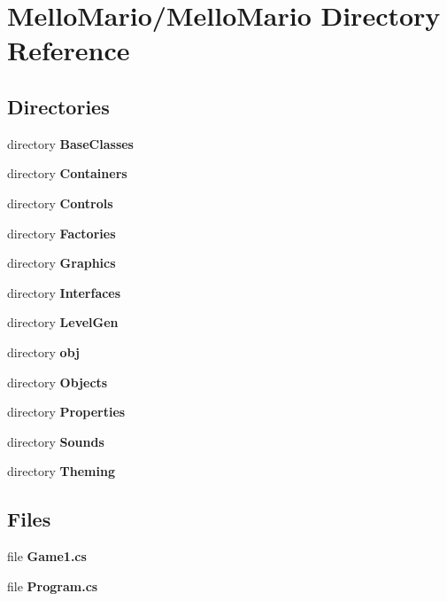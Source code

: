 \section{Mello\+Mario/\+Mello\+Mario Directory Reference}
\label{dir_e3c28bfbfb1d5eadc96be0f0a6d9a80d}
\subsection*{Directories}
\begin{DoxyCompactItemize}
\item 
directory \textbf{ Base\+Classes}
\item 
directory \textbf{ Containers}
\item 
directory \textbf{ Controls}
\item 
directory \textbf{ Factories}
\item 
directory \textbf{ Graphics}
\item 
directory \textbf{ Interfaces}
\item 
directory \textbf{ Level\+Gen}
\item 
directory \textbf{ obj}
\item 
directory \textbf{ Objects}
\item 
directory \textbf{ Properties}
\item 
directory \textbf{ Sounds}
\item 
directory \textbf{ Theming}
\end{DoxyCompactItemize}
\subsection*{Files}
\begin{DoxyCompactItemize}
\item 
file \textbf{ Game1.\+cs}
\item 
file \textbf{ Program.\+cs}
\end{DoxyCompactItemize}
